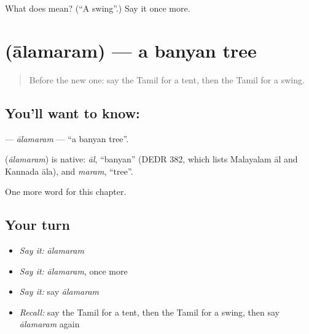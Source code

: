 \begin{tcolorbox}[breakable,colback=teal!4,colframe=teal!35!black,title={Before you move on}]
What does  mean? (\textquotedblleft{}A swing\textquotedblright{}.) Say it once more.
\end{tcolorbox}
\section[\texorpdfstring{\ta{ஆலமரம்} (ālamaram)}{ஆலமரம் (ālamaram)}]{ (ālamaram) — a banyan tree}

\label{lesson:TA-C250-alamaram}



\begin{quote}
Before the new one: say the Tamil for a tent, then the Tamil for a swing.
\end{quote}

\subsection*{You'll want to know: }
\textbf{} — \emph{ālamaram} — \textquotedblleft{}a banyan tree\textquotedblright{}.

\begin{cousinweb}
\textbf{} (\emph{ālamaram}) is native: \emph{āl}, \textquotedblleft{}banyan\textquotedblright{} (DEDR 382, which lists Malayalam āl and Kannada āla), and \emph{maram}, \textquotedblleft{}tree\textquotedblright{}.
\end{cousinweb}

\begin{grammarlens}[title={What you've built}]
One more word for this chapter.
\end{grammarlens}

\subsection*{Your turn}
\begin{itemize}
\raggedright
  \item \emph{Say it:} \emph{ālamaram}
  \item \emph{Say it:} \emph{ālamaram}, once more
  \item \emph{Say it:} say \emph{ālamaram}
  \item \emph{Recall:} say the Tamil for a tent, then the Tamil for a swing, then say \emph{ālamaram} again
\end{itemize}

